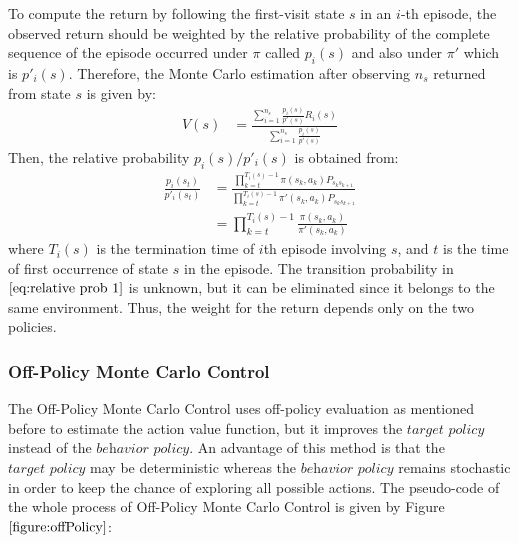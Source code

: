 \documentclass[paper=a4, fontsize=11pt]{scrartcl}
\numberwithin{equation}{section}		%
\numberwithin{figure}{section}			%
\numberwithin{table}{section}				%
\begin{document}
To compute the return by following the first-visit state $s$ in an  $i$-th episode, the observed return should be weighted by the relative probability of the complete sequence of the episode occurred under $\pi$ called $p_i(s)$ and also under $\pi'$ which is $p'_i(s)$. Therefore, the Monte Carlo estimation after observing $n_s$ returned from state $s$ is given by:
\begin{align}
V(s) &= \frac{\sum_{i=1}^{n_s}\frac{p_i(s)}{p'(s)}R_i(s)}{\sum_{i=1}^{n_s}\frac{p_i(s)}{p'(s)}}
\end{align} 
Then, the relative probability $p_i(s)/p'_i(s)$ is obtained from:
\begin{align}
\frac{p_i(s_t)}{p'_i(s_t)} &= \frac{\prod_{k=t}^{T_i(s)-1}\pi(s_k,a_k)P_{s_ks_{k+1}}}{\prod_{k=t}^{T_i(s)-1}\pi'(s_k,a_k)P_{s_ks_{k+1}}} \label{eq:relative prob 1} \\
&= \prod_{k=t}^{T_i(s)-1}\frac{\pi(s_k,a_k)}{\pi'(s_k,a_k)} 
\end{align}
where $T_i(s)$ is the termination time of $i$th episode involving $s$, and $t$ is the time of first occurrence of state $s$ in the episode. The transition probability in $\eqref{eq:relative prob 1}$ is unknown, but it can be eliminated since it belongs to the same environment. Thus, the weight for the return depends only on the two policies.

\subsubsection*{Off-Policy Monte Carlo Control}
The Off-Policy Monte Carlo Control uses off-policy evaluation as mentioned before to estimate the action value function, but it improves the $\textit{target policy}$ instead of the $\textit{behavior policy}$. An advantage of this method is that the $\textit{target policy}$ may be deterministic whereas the $\textit{behavior policy}$ remains stochastic in order to keep the chance of exploring all possible actions. The pseudo-code of the whole process of Off-Policy Monte Carlo Control is given by Figure $\ref{figure:offPolicy}$:
\end{document}
